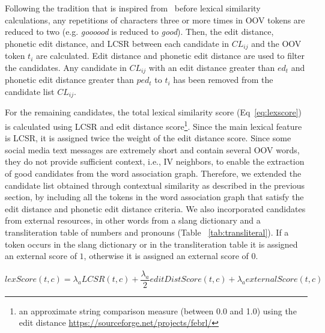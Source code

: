 \documentclass[preprint,review,12pt]{elsarticle}
\begin{document}
Following the tradition that is inspired from~\cite{Kaufmann2010} before lexical similarity calculations, any repetitions of characters three or more times in OOV tokens are reduced to two (e.g. \emph{goooood} is reduced to \emph{good}). Then, the edit distance, phonetic edit distance, and LCSR between each candidate in $CL_{ij}$ and the OOV token $t_i$ are calculated. Edit distance and phonetic edit distance are used to filter the candidates. Any candidate in $CL_{ij}$ with an edit distance greater than $ed_t$ and phonetic edit distance greater than $ped_t$ to $t_i$ has been removed from the candidate list $CL_{ij}$.

For the remaining candidates, the total lexical similarity score (Eq~\ref{eq:lexscore}) is calculated using LCSR and edit distance score\footnote{an approximate string comparison measure (between 0.0 and 1.0) using the edit distance \url{https://sourceforge.net/projects/febrl/}}. Since the main lexical feature is LCSR, it is assigned twice the weight of the edit distance score. Since some social media text messages are extremely short and contain several OOV words, they do not provide sufficient context, i.e., IV neighbors, to enable the extraction of good candidates from the word association graph. Therefore, we extended the candidate list obtained through contextual similarity as described in the previous section, by including all the tokens in the word association graph that satisfy the edit distance and phonetic edit distance criteria. We also incorporated candidates from external resources, in other words from a slang dictionary and a transliteration table of numbers and pronouns (Table ~\ref{tab:transliteral}). If a token occurs in the slang dictionary or in the transliteration table it is assigned an external score of $1$, otherwise it is assigned an external score of $0$.

\begin{equation}
lexScore(t,c) = \lambda_a LCSR(t,c) + \frac{\lambda_a} 2 editDistScore(t,c) + \lambda_a externalScore(t,c)
\label{eq:lexscore}
\end{equation}
\end{document}
